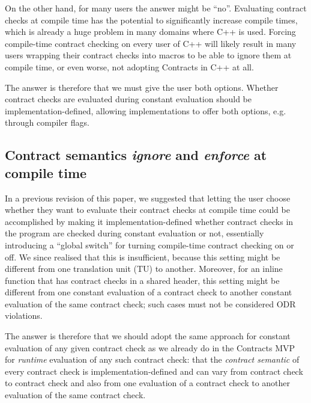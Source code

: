 On the other hand, for many users the answer might be ``no''. Evaluating contract checks at compile time has the potential to significantly increase compile times, which is already a huge problem in many domains where C++ is used. Forcing compile-time contract checking on every user of C++ will likely result in many users wrapping their contract checks into macros to be able to ignore them at compile time, or even worse, not adopting Contracts in C++ at all.

The answer is therefore that we must give the user both options. Whether contract checks are evaluated during constant evaluation should be implementation-defined, allowing implementations to offer both options, e.g. through compiler flags.

\subsection{Contract semantics \emph{ignore} and \emph{enforce} at compile time}

In a previous revision of this paper, we suggested that letting the user choose whether they want to evaluate their contract checks at compile time could be accomplished by making it implementation-defined whether contract checks in the program are checked during constant evaluation or not, essentially introducing a ``global switch'' for turning compile-time contract checking on or off. We since realised that this is insufficient, because this setting might be different from one translation unit (TU) to another. Moreover, for an inline function that has contract checks in a shared header, this setting might be different from one constant evaluation of a contract check to another constant evaluation of the same contract check; such cases must not be considered ODR violations.

The answer is therefore that we should adopt the same approach for constant evaluation of any given contract check as we already do in the Contracts MVP \cite{P2900R1} for \emph{runtime} evaluation of any such contract check: that the \emph{contract semantic} of every contract check is implementation-defined and can vary from contract check to contract check and also from one evaluation of a contract check to another evaluation of the same contract check.

